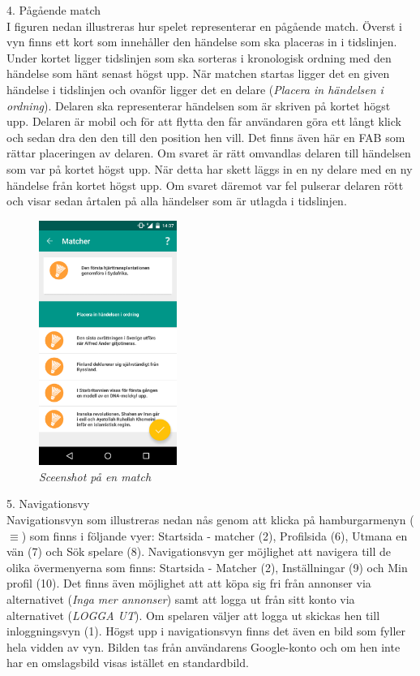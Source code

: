 \documentclass[a4paper, 11pt]{article}
\begin{document}
\pagebreak
 \large \textup{4. Pågående match}\\
I figuren nedan illustreras hur spelet representerar en pågående match. Överst i vyn finns ett kort som innehåller den händelse som ska placeras in i tidslinjen. Under kortet ligger tidslinjen som ska sorteras i kronologisk ordning med den händelse som hänt senast högst upp. När matchen startas ligger det en given händelse i tidslinjen och ovanför ligger det en delare (\textit{Placera in händelsen i ordning}). Delaren ska representerar händelsen som är skriven på kortet högst upp. Delaren är mobil och för att flytta den får användaren göra ett långt klick och sedan dra den den till den position hen vill. Det finns även här en FAB som rättar placeringen av delaren. Om svaret är rätt omvandlas delaren till händelsen som var på kortet högst upp. När detta har skett läggs in en ny delare med en ny händelse från kortet högst upp. Om svaret däremot var fel pulserar delaren rött och visar sedan årtalen på alla händelser som är utlagda i tidslinjen.


\begin{figure}[H]
	\begin{center}
	\includegraphics[width=0.4\textwidth]{app_match} 
	\end{center}
	\caption{\textit{Sceenshot på en match}}
\end{figure}



\pagebreak
\large \textup{5. Navigationsvy}\\
Navigationsvyn som illustreras nedan nås genom att klicka på hamburgarmenyn ($\equiv$) som finns i följande vyer: Startsida - matcher (2), Profilsida (6), Utmana en vän (7) och Sök spelare (8). Navigationsvyn ger möjlighet att navigera till de olika övermenyerna som finns: Startsida - Matcher (2), Inställningar (9) och Min profil (10). Det finns även möjlighet att att köpa sig fri från annonser via alternativet (\textit{Inga mer annonser}) samt att logga ut från sitt konto via alternativet (\textit{LOGGA UT}). Om spelaren väljer att logga ut skickas hen till inloggningsvyn (1). 
Högst upp i navigationsvyn finns det även en bild som fyller hela vidden av vyn. Bilden tas från användarens Google-konto och om hen inte har en omslagsbild visas istället en standardbild.   
\end{document}
